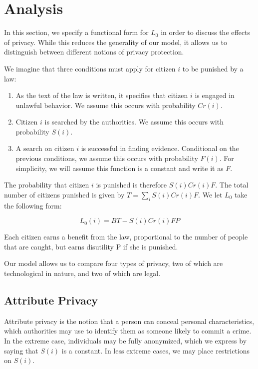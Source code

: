 
\section{Analysis}
\label{sec:analysis}

In this section, we specify a functional form for $L_0$ in order to discuss the effects of privacy.  While this reduces the generality of our model, it allows us to distinguish between different notions of privacy protection.  

We imagine that three conditions must apply for citizen $i$ to be punished by a law:

\begin{enumerate}
\item As the text of the law is written, it specifies that citizen $i$ is engaged in unlawful behavior.  We assume this occurs with probability $Cr(i)$.
\item Citizen $i$ is searched by the authorities.  We assume this occurs with probability $S(i)$.
\item A search on citizen $i$ is successful in finding evidence.  Conditional on the previous conditions, we assume this occurs with probability $F(i)$.  For simplicity, we will assume this function is a constant and write it as $F$.
\end{enumerate}

The probability that citizen $i$ is punished is therefore $S(i)Cr(i)F$.  The total number of citizens punished is given by $T = \sum_i S(i)Cr(i)F$.  We let $L_0$ take the following form:

$$L_0(i) = BT - S(i)Cr(i)FP$$

Each citizen earns a benefit from the law, proportional to the number of people that are caught, but earns disutility P if she is punished.

Our model allows us to compare four types of privacy, two of which are technological in nature, and two of which are legal.

\subsection{Attribute Privacy}

Attribute privacy is the notion that a person can conceal personal characteristics, which authorities may use to identify them as someone likely to commit a crime.  In the extreme case, individuals may be fully anonymized, which we express by saying that $S(i)$ is a constant.  In less extreme cases, we may place restrictions on $S(i)$.

